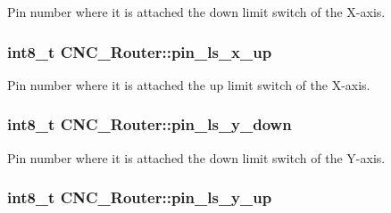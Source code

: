 Pin number where it is attached the down limit switch of the X-\/axis. 

\hypertarget{class_c_n_c___router_af935b225740dd189dcdcdca7664eb850}{
\subsubsection[{pin\+\_\+ls\+\_\+x\+\_\+up}]{\setlength{\rightskip}{0pt plus 5cm}int8\+\_\+t C\+N\+C\+\_\+\+Router\+::pin\+\_\+ls\+\_\+x\+\_\+up\hspace{0.3cm}{\ttfamily [private]}}}\label{class_c_n_c___router_af935b225740dd189dcdcdca7664eb850}


Pin number where it is attached the up limit switch of the X-\/axis. 

\hypertarget{class_c_n_c___router_a19cd8e9840fbfab991f9cab1300abe04}{
\subsubsection[{pin\+\_\+ls\+\_\+y\+\_\+down}]{\setlength{\rightskip}{0pt plus 5cm}int8\+\_\+t C\+N\+C\+\_\+\+Router\+::pin\+\_\+ls\+\_\+y\+\_\+down\hspace{0.3cm}{\ttfamily [private]}}}\label{class_c_n_c___router_a19cd8e9840fbfab991f9cab1300abe04}


Pin number where it is attached the down limit switch of the Y-\/axis. 

\hypertarget{class_c_n_c___router_a056de16bac1a523455a7be2903e44f40}{
\subsubsection[{pin\+\_\+ls\+\_\+y\+\_\+up}]{\setlength{\rightskip}{0pt plus 5cm}int8\+\_\+t C\+N\+C\+\_\+\+Router\+::pin\+\_\+ls\+\_\+y\+\_\+up\hspace{0.3cm}{\ttfamily [private]}}}\label{class_c_n_c___router_a056de16bac1a523455a7be2903e44f40}


